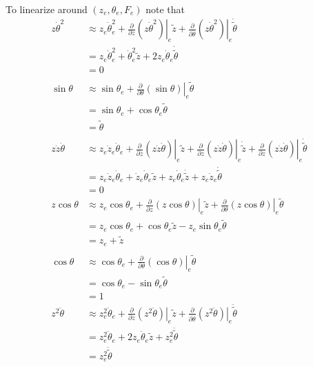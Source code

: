 To linearize around $(z_e, \theta_e, F_e)$ note that
\begin{align*}
  z \dot{\theta}^2 &\approx z_e \dot{\theta}_e^2 + \left. \frac{\partial}{\partial z} \left( z \dot{\theta}^2\right)\right|_e \tilde{z} + \left. \frac{\partial}{\partial \dot{\theta}} \left( z \dot{\theta}^2\right)\right|_e \dot{\tilde{\theta}} \\
    &= z_e \dot{\theta}_e^2 + \dot{\theta}_e^2 \tilde{z} + 2 z_e \dot{\theta}_e \dot{\tilde{\theta}} \\
	&= 0 \\
    \\
  \sin\theta &\approx \sin\theta_e + \left. \frac{\partial}{\partial \theta} \left( \sin\theta \right) \right|_e \tilde{\theta} \\
    &= \sin\theta_e + \cos\theta_e \tilde{\theta} \\
    &=   \tilde{\theta} \\
  \\
  z \dot{z} \dot{\theta} &\approx z_e \dot{z}_e \dot{\theta}_e + \left. \frac{\partial}{\partial z} \left( z \dot{z} \dot{\theta}\right)\right|_e \tilde{z} + \left. \frac{\partial}{\partial z} \left( z \dot{z} \dot{\theta}\right)\right|_e \dot{\tilde{z}} + \left. \frac{\partial}{\partial z} \left( z \dot{z} \dot{\theta}\right)\right|_e \dot{\tilde{\theta}} \\
    &= z_e \dot{z}_e \dot{\theta}_e + \dot{z}_e \dot{\theta}_e \tilde{z} + z_e \dot{\theta}_e \dot{\tilde{z}} + z_e \dot{z}_e \dot{\tilde{\theta}} \\
	&= 0
    \\
  z \cos\theta &\approx z_e \cos\theta_e + \left. \frac{\partial}{\partial z} \left( z \cos\theta \right)\right|_e \tilde{z} + \left. \frac{\partial}{\partial \theta} \left( z \cos\theta \right)\right|_e \tilde{\theta} \\
    &= z_e \cos\theta_e + \cos\theta_e \tilde{z} - z_e \sin\theta_e \tilde{\theta} \\
	&= z_e + \tilde{z} \\
    \\
  \cos\theta &\approx \cos\theta_e +  \left.\frac{\partial}{\partial \theta} \left( \cos\theta \right) \right|_e \tilde{\theta} \\
  &= \cos\theta_e - \sin\theta_e \tilde{\theta} \\
  &= 1
  \\
  z^2 \ddot{\theta} &\approx z_e^2 \ddot{\theta}_e + \left. \frac{\partial}{\partial z} \left( z^2 \ddot{\theta} \right)\right|_e \tilde{z} + \left. \frac{\partial}{\partial \ddot{\theta}} \left( z^2 \ddot{\theta} \right)\right|_e \ddot{\tilde{\theta}} \\
    &= z_e^2 \ddot{\theta}_e + 2 z_e \ddot{\theta}_e \tilde{z} + z_e^2 \ddot{\tilde{\theta}} \\
    &= z_e^2 \ddot{\tilde{\theta}}
\end{align*}

